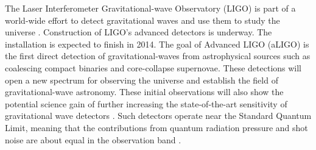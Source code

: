 \newcommand{\tcr}{\textcolor{red}}
\newcommand{\tcb}{\textcolor{blue}}
\newcommand{\tcm}{\textcolor{magenta}}
\newcommand{\tcg}{\textcolor{green}}
\newcommand{\tcp}{\textcolor{purple}}
\newcommand{\irm}{\mathrm{i}}



The Laser Interferometer Gravitational-wave Observatory (LIGO) is part of a world-wide 
effort to detect gravitational waves and use them to study the universe \cite{BPAbbott09}. Construction of 
LIGO's advanced detectors is underway. The installation is expected to finish in 2014. The goal of Advanced LIGO (aLIGO) is the first direct detection of gravitational-waves 
from astrophysical sources such as coalescing compact binaries and core-collapse supernovae.
These detections will open a new spectrum for observing the universe and establish the field of 
gravitational-wave astronomy. 
These initial observations will also show the potential science gain of further increasing the state-of-the-art sensitivity of gravitational wave detectors \cite{Smith09,Harry10,Losurdo12}. Such detectors operate near the Standard Quantum Limit, meaning that the contributions from quantum radiation pressure and shot noise are about equal in the observation band \cite{Caves80, Ni86}.

